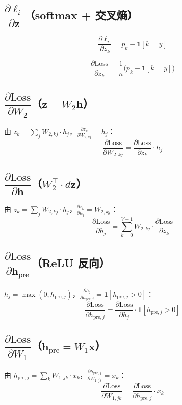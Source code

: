 \documentclass[12pt,a4paper]{article}
\begin{document}
\subsection{$\dfrac{\partial \ell_i}{\partial \mathbf{z}}$（softmax + 交叉熵）}

\[
\frac{\partial \ell_i}{\partial z_k} = p_k - \mathbf{1}[k = y]
\]

\[
\frac{\partial \text{Loss}}{\partial z_k} = \frac{1}{n}\big(p_k - \mathbf{1}[k = y]\big)
\]

\subsection{$\dfrac{\partial \text{Loss}}{\partial W_2}$（$\mathbf{z} = W_2 \mathbf{h}$）}

由 $z_k = \sum_j W_{2,kj} \cdot h_j$，$\frac{\partial z_k}{\partial W_{2,kj}} = h_j$：
\[
\frac{\partial \text{Loss}}{\partial W_{2,kj}} = \frac{\partial \text{Loss}}{\partial z_k} \cdot h_j
\]

\subsection{$\dfrac{\partial \text{Loss}}{\partial \mathbf{h}}$（$W_2^\top \cdot d\mathbf{z}$）}

由 $z_k = \sum_j W_{2,kj} \cdot h_j$，$\frac{\partial z_k}{\partial h_j} = W_{2,kj}$：
\[
\frac{\partial \text{Loss}}{\partial h_j} = \sum_{k=0}^{V-1} W_{2,kj} \cdot \frac{\partial \text{Loss}}{\partial z_k}
\]

\subsection{$\dfrac{\partial \text{Loss}}{\partial \mathbf{h}_{\text{pre}}}$（ReLU 反向）}

$h_j = \max(0, h_{\text{pre},j})$，$\frac{\partial h_j}{\partial h_{\text{pre},j}} = \mathbf{1}[h_{\text{pre},j} > 0]$：
\[
\frac{\partial \text{Loss}}{\partial h_{\text{pre},j}} = \frac{\partial \text{Loss}}{\partial h_j} \cdot \mathbf{1}[h_{\text{pre},j} > 0]
\]

\subsection{$\dfrac{\partial \text{Loss}}{\partial W_1}$（$\mathbf{h}_{\text{pre}} = W_1 \mathbf{x}$）}

由 $h_{\text{pre},j} = \sum_k W_{1,jk} \cdot x_k$，$\frac{\partial h_{\text{pre},j}}{\partial W_{1,jk}} = x_k$：
\[
\frac{\partial \text{Loss}}{\partial W_{1,jk}} = \frac{\partial \text{Loss}}{\partial h_{\text{pre},j}} \cdot x_k
\]
\end{document}

